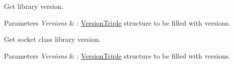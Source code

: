 Get library version. 
\begin{DoxyParams}{Parameters}
{\em Versions} & \+: \hyperlink{structPThreadClassLib_1_1VersionTriple}{Version\+Triple} structure to be filled with versions.\\
\hline
\end{DoxyParams}
Get socket class library version. 
\begin{DoxyParams}{Parameters}
{\em Versions} & \+: \hyperlink{structPThreadClassLib_1_1VersionTriple}{Version\+Triple} structure to be filled with versions. \\
\hline
\end{DoxyParams}
